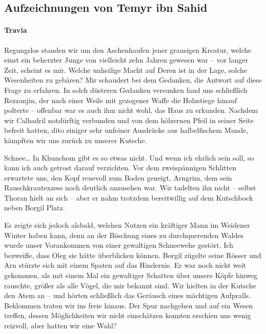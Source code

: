 \documentclass[11pt]{scrreprt}
\begin{document}
\subsection{Aufzeichnungen von Temyr ibn Sahid}

\paragraph{Travia}
Regungslos standen wir um den Aschenhaufen jener grausigen Kreatur, welche einst ein beherzter Junge von vielleicht zehn Jahren gewesen war – vor langer Zeit, scheint es mir. Welche unheilige Macht auf Deren ist in der Lage, solche Wesenheiten zu gebären? Mir schaudert bei dem Gedanken, die Antwort auf diese Frage zu erfahren. In solch düsteren Gedanken versunken fand uns schließlich Rezzanjin, der nach einer Weile mit gezogener Waffe die Holzstiege hinauf polterte – offenbar war es auch ihm nicht wohl, das Haus zu erkunden. Nachdem wir Calhadril notdürftig verbunden und von dem hölzernen Pfeil in seiner Seite befreit hatten, dito einiger sehr unfeiner Ausdrücke aus halbelfischem Munde, kämpften wir uns zurück zu unserer Kutsche. \par

Schnee… In Khunchom gibt es so etwas nicht. Und wenn ich ehrlich sein soll, so kann ich auch getrost darauf verzichten. Vor dem zweispännigen Schlitten erwartete uns, den Kopf reuevoll zum Boden geneigt, Arngrim, dem sein Rauschkrautexzess noch deutlich anzusehen war. Wir tadelten ihn nicht – selbst Thoran hielt an sich – aber er nahm trotzdem bereitwillig auf dem Kutschbock neben Borgil Platz. \par

Es zeigte sich jedoch alsbald, welchen Nutzen ein kräftiger Mann im Weidener Winter haben kann, denn an der Böschung eines zu durchquerenden Waldes wurde unser Vorankommen von einer gewaltigen Schneewehe gestört. Ich bezweifle, dass Oleg sie hätte überblicken können. Borgil zügelte seine Rösser und Arn stürzte sich mit einem Spaten auf das Hindernis. Er war noch nicht weit gekommen, als mit einem Mal ein gewaltiger Schatten über unsere Köpfe hinweg rauschte, größer als alle Vögel, die mir bekannt sind. Wir hielten in der Kutsche den Atem an – und hörten schließlich das Geräusch eines mächtigen Aufpralls. Beklommen traten wir ins freie hinaus. Der Spur nachgehen und auf ein Wesen treffen, dessen Möglichkeiten wir nicht einschätzen konnten erschien uns wenig reizvoll, aber hatten wir eine Wahl?\par
\end{document}

